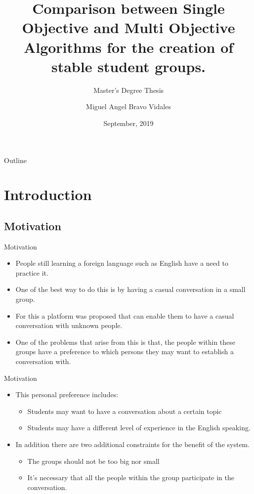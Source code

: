 \documentclass{beamer}
\title[Master's Degree Thesis]{Comparison between Single Objective and Multi Objective Algorithms for the creation of stable student groups.}
\subtitle{Master's Degree Thesis}
\author{Miguel Angel Bravo Vidales}
\institute[] 
{School of Engineering and Sciences \\
  Computer Science}
\date{September, 2019}
\begin{document}
\begin{frame}
  \titlepage
\end{frame}

\begin{frame}{Outline}
  \tableofcontents
\end{frame}

\section{Introduction}

    \subsection{Motivation}
    \begin{frame}{Motivation}
        \begin{itemize}
            \item  People still learning a foreign language such as English have a need to practice it. 
            \item One of the best way to do this is by having a casual conversation in a small group.
            \item For this a platform was proposed that can enable them to have a casual conversation with unknown people.
            \item One of the problems that arise from this is that, the people within these groups have a preference to which persons they may want to establish a conversation with.
        \end{itemize}
    \end{frame}
    
    \begin{frame}{Motivation} %
        \begin{itemize}
            \item This personal preference includes:
            \begin{itemize}
                \item Students may want to have a conversation about a certain topic
                \item Students may have a different level of experience in the English speaking.
            \end{itemize}
        \item In addition there are two additional constraints for the benefit of the system.
            \begin{itemize}
                \item The groups should not be too big nor small
                \item It's necessary that all the people within the group participate in the conversation.
        \end{itemize}
    \end{itemize}
    \end{frame}
\end{document}
